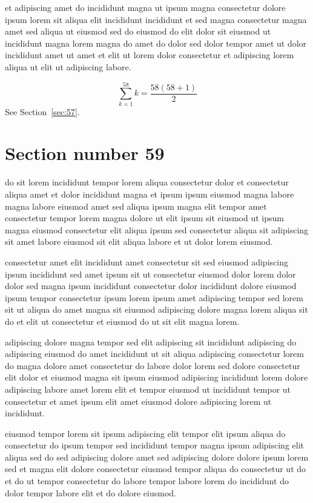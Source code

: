 \documentclass{article}
\begin{document}
et adipiscing amet do incididunt magna ut ipsum magna consectetur dolore ipsum lorem sit aliqua elit incididunt incididunt et sed magna consectetur magna amet sed aliqua ut eiusmod sed do eiusmod do elit dolor sit eiusmod ut incididunt magna lorem magna do amet do dolor sed dolor tempor amet ut dolor incididunt amet ut amet et elit ut lorem dolor consectetur et adipiscing lorem aliqua ut elit ut adipiscing labore.

\begin{equation} \sum_{k=1}^{58} k = \frac{58(58+1)}{2} \end{equation}
See Section~\ref{sec:57}.

\section{Section number 59}\label{sec:59}
do sit lorem incididunt tempor lorem aliqua consectetur dolor et consectetur aliqua amet et dolor incididunt magna et ipsum ipsum eiusmod magna labore magna labore eiusmod amet sed aliqua ipsum magna elit tempor amet consectetur tempor lorem magna dolore ut elit ipsum sit eiusmod ut ipsum magna eiusmod consectetur elit aliqua ipsum sed consectetur aliqua sit adipiscing sit amet labore eiusmod sit elit aliqua labore et ut dolor lorem eiusmod.

consectetur amet elit incididunt amet consectetur sit sed eiusmod adipiscing ipsum incididunt sed amet ipsum sit ut consectetur eiusmod dolor lorem dolor dolor sed magna ipsum incididunt consectetur dolor incididunt dolore eiusmod ipsum tempor consectetur ipsum lorem ipsum amet adipiscing tempor sed lorem sit ut aliqua do amet magna sit eiusmod adipiscing dolore magna lorem aliqua sit do et elit ut consectetur et eiusmod do ut sit elit magna lorem.

adipiscing dolore magna tempor sed elit adipiscing sit incididunt adipiscing do adipiscing eiusmod do amet incididunt ut sit aliqua adipiscing consectetur lorem do magna dolore amet consectetur do labore dolor lorem sed dolore consectetur elit dolor et eiusmod magna sit ipsum eiusmod adipiscing incididunt lorem dolore adipiscing labore amet lorem elit et tempor eiusmod ut incididunt tempor ut consectetur et amet ipsum elit amet eiusmod dolore adipiscing lorem ut incididunt.

eiusmod tempor lorem sit ipsum adipiscing elit tempor elit ipsum aliqua do consectetur do ipsum tempor sed incididunt tempor magna ipsum adipiscing elit aliqua sed do sed adipiscing dolore amet sed adipiscing dolore dolore ipsum lorem sed et magna elit dolore consectetur eiusmod tempor aliqua do consectetur ut do et do ut tempor consectetur do labore tempor labore lorem do incididunt do dolor tempor labore elit et do dolore eiusmod.
\end{document}
